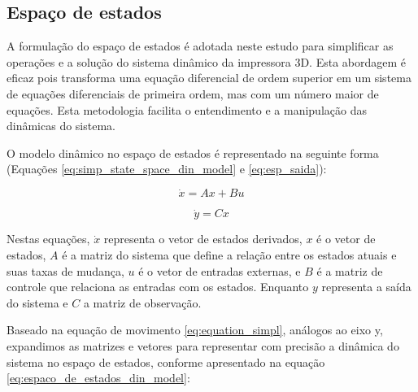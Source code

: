 \subsection{Espaço de estados}
A formulação do espaço de estados é adotada neste estudo para simplificar as operações e a solução do sistema dinâmico da impressora 3D. Esta abordagem é eficaz pois transforma uma equação diferencial de ordem superior em um sistema de equações diferenciais de primeira ordem, mas com um número maior de equações. Esta metodologia facilita o entendimento e a manipulação das dinâmicas do sistema.

O modelo dinâmico no espaço de estados é representado na seguinte forma (Equações \ref{eq:simp_state_space_din_model} e \ref{eq:esp_saida}):

\begin{equation}
    \label{eq:simp_state_space_din_model}
    \dot x = Ax+Bu
\end{equation}

\begin{equation}
    \label{eq:esp_saida}
    \dot y = Cx
\end{equation}

Nestas equações, \(\dot x\) representa o vetor de estados derivados, \(x\) é o vetor de estados, \(A\) é a matriz do sistema que define a relação entre os estados atuais e suas taxas de mudança, \(u\) é o vetor de entradas externas, e \(B\) é a matriz de controle que relaciona as entradas com os estados. Enquanto \(y\) representa a saída do sistema e \(C\) a matriz de observação.

Baseado na equação de movimento \ref{eq:equation_simpl}, análogos ao eixo y, expandimos as matrizes e vetores para representar com precisão a dinâmica do sistema no espaço de estados, conforme apresentado na equação \ref{eq:espaco_de_estados_din_model}:

